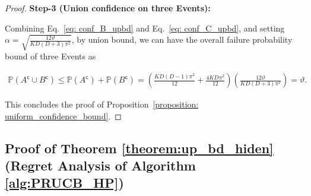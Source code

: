 \begin{proof}
\textbf{Step-3 (Union confidence on three Events):} 

Combining Eq.~\ref{eq: conf_B_upbd} and Eq.~\ref{eq: conf_C_upbd}, and setting $\alpha = \sqrt{\frac{12 \vartheta}{KD(D+3) \pi^2}}$, by union bound, we can have the overall failure probability bound of three Events as

\[
\begin{aligned}
\mathbb{P} (A^\mathsf{c} \cup B^\mathsf{c}) 
\leq 
\mathbb{P} (A^\mathsf{c}) + \mathbb{P} (B^\mathsf{c})
= 
\left( \frac{KD(D-1) \pi^2}{12} + \frac{4KD \pi^2}{12} \right) \left(\frac{12 \vartheta}{KD(D+3) \pi^2} \right)
= 
\vartheta.
\end{aligned}
\]

This concludes the proof of Proposition~\ref{proposition: uniform_confidence_bound}.
\end{proof}


\subsection{Proof of Theorem \ref{theorem:up_bd_hiden} (Regret Analysis of Algorithm \ref{alg:PRUCB_HP})}
\label{sec: app_pf_thm_up_bd_hiden}

